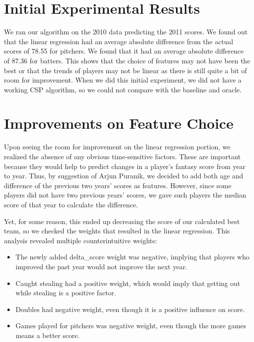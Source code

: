 \documentclass[12pt]{amsart}
\begin{document}
\section{\large Initial Experimental Results}
We ran our algorithm on the 2010 data predicting the 2011 scores. We found out that the linear regression had an average absolute difference from the actual scores of 78.55 for pitchers. We found that it had an average absolute difference of 87.36 for batters. This shows that the choice of features may not have been the best or that the trends of players may not be linear as there is still quite a bit of room for improvement. When we did this initial experiment, we did not have a working CSP algorithm, so we could not compare with the baseline and oracle.

\section{\large Improvements on Feature Choice}
Upon seeing the room for improvement on the linear regression portion, we realized the absence of any obvious time-sensitive factors. These are important because they would help to predict changes in a player's fantasy score from year to year. Thus, by suggestion of Arjun Puranik, we decided to add both age and difference of the previous two years' scores as features. However, since some players did not have two previous years' scores, we gave such players the median score of that year to calculate the difference. 
\vspace{.4cm}

Yet, for some reason, this ended up decreasing the score of our calculated best team, so we checked the weights that resulted in the linear regression. This analysis revealed multiple counterintuitive weights:
\begin{itemize}
	\item The newly added delta\_score weight was negative, implying that players who improved the past year would not improve the next year. \\
	\item Caught stealing had a positive weight, which would imply that getting out while stealing is a positive factor. \\
	\item Doubles had negative weight, even though it is a positive influence on score.\\
	\item Games played for pitchers was negative weight, even though the more games means a better score.
\end{itemize}
\vspace{.4cm}
\end{document}
